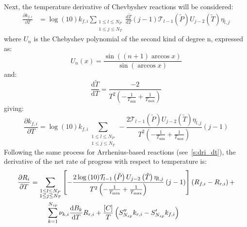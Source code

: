 \documentclass[12pt,number,sort&compress]{elsarticle}
\newcommand{\ns}{N_{sp}}
\begin{document}
Next, the temperature derivative of Chevbyshev reactions will be considered:
\begin{align}
 \frac{\partial {k_{f, i}} }{\partial T } &= \log{\left (10 \right )} {k_{f, i}} \sum_{\substack{1 \leq l \leq N_{P}\\1 \leq j \leq N_{T}}} \frac{\text{d} \tilde{T} }{\text{d} T } \left(j - 1\right) \mathcal{T}_{l - 1}\left(\tilde{P}\right) U_{j - 2}\left(\tilde{T}\right) \eta_{l,j}
\end{align}
where $U_n$ is the Chebyshev polynomial of the second kind of degree n, expressed as:
\begin{equation}
 U_n \left(x\right) = \frac{\sin\left(\left(n + 1\right) \arccos x\right)}{\sin \left(\arccos x \right)}
\end{equation}
and:
\begin{equation}
 \frac{\text{d} \tilde{T}}{\text{d} T} = \frac{-2}{T^2 \left(-\frac{1}{T_{\min}} + \frac{1}{T_{\text{max}}}\right)}
\end{equation}
giving:
\begin{equation}
 \frac{\partial {k_{f, i}} }{\partial T } = \log{\left (10 \right )} {k_{f, i}} \sum_{\substack{1 \leq l \leq N_{P}\\1 \leq j \leq N_{T}}} - \frac{2 \mathcal{T}_{l - 1}\left(\tilde{P}\right) U_{j - 2}\left(\tilde{T}\right) \eta_{l,j}}{T^{2} \left(- \frac{1}{T_{\min}} + \frac{1}{T_{\max}}\right)} \left(j - 1\right)
\end{equation}
Following the same process for Arrhenius-based reactions (see~\cref{s:dri_dt}), the derivative of the net rate of progress with respect to temperature is:
\begin{align}
 \label{e:drop_cheb_dT}
 \frac{\partial R_{i}}{\partial T } &= \sum_{\substack{1 \leq l \leq N_{P}\\1 \leq j \leq N_{T}}} \left[ - \frac{2 \log{\left (10 \right )} \mathcal{T}_{l - 1}\left(\tilde{P}\right) U_{j - 2}\left(\tilde{T}\right) \eta_{l,j}}{T^{2} \left(- \frac{1}{T_{\min}} + \frac{1}{T_{\max}}\right)} \left(j - 1\right) \right] \left({R_{f, i}} - {R_{r, i}}\right) + \nonumber \\
				     & \mathindent \sum_{k=1}^{\ns} \nu_{k,i} \frac{\text{d} B_{k} }{\text{d} T } {R_{r, i}} + \frac{[C]}{T} \left(S^{\prime\prime}_{\ns} {k_{r, i}} - S^{\prime}_{\ns} {k_{f, i}}\right)
\end{align}
\end{document}

